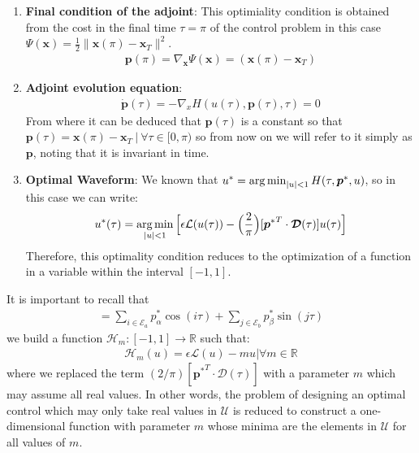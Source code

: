 \begin{enumerate}

    \item \textbf{Final condition of the adjoint}: This optimiality condition is obtained from the cost in the final time $\tau = \pi$ of the control problem in this case $ \Psi (\bm{x}) = \frac {1}{2} \| \bm{x} (\pi) - \bm{x}_T \|^2 $.
    \begin{gather}
        \bm{p}(\pi) = \nabla_{\bm{x}} \Psi(\bm{x}) =  (\bm{x} (\pi) - \bm{x}_T)
    \end{gather}
    \item \textbf{Adjoint evolution equation}: 
    \begin{gather}
        \dot{\bm{p}}(\tau) = -\nabla_x H(u(\tau),\bm{p}(\tau),\tau) = 0
    \end{gather}
    From where it can be deduced that $ \bm {p} (\tau)$ is a constant so that $ \bm {p} (\tau) = \bm {x} (\pi) - \bm { x} _T \ | \ \forall \tau \in [0, \pi) $ so from now on we will refer to it simply as $ \bm {p} $, noting that it is invariant in time.
    \item \textbf{Optimal  Waveform}: We known that $ u^* = \operatorname*{arg\,min}_{|u|<1} H(\tau,\bm{p}^*,u)$, so in this case we can write:
    \begin{gather}
        u^*(\tau) = \operatorname*{arg\,min}_{|u|<1}  \Big[   \epsilon \mathcal{L}(u(\tau)) - \Big(\frac{2}{\pi}\Big)
        [{\bm{p}^*}^T \cdot \bm{\mathcal{D}}(\tau)]
        u(\tau) \Big]
    \end{gather}
    Therefore, this optimality condition reduces to the optimization of a function in a variable within the interval $ [- 1,1] $. 
\end{enumerate}
%
It is important to recall that
\begin{gather}
	[{\bm{p}^*}^T \cdot \bm{\mathcal{D}}(\tau)] = \sum_{i \in \mathcal{E}_a} p^*_\alpha \cos(i\tau) + \sum_{j \in \mathcal{E}_b} p^*_\beta \sin(j\tau) 
\end{gather}
we build a function $\mathcal{H}_m: [-1,1] \rightarrow \mathbb{R}$ such that:
\begin{gather}
    \mathcal{H}_m(u) = \epsilon \mathcal{L}(u) - mu  |  \forall m \in \mathbb{R}
\end{gather}
where we replaced the term $(2/\pi)[{\bm{p}^*}^T \cdot \bm{\mathcal{D}}(\tau)]$ with a parameter $m$ which may assume all real values. In other words, the problem of designing an optimal control which may only take real values in $\mathcal{U}$ is reduced to construct a one-dimensional function with parameter $m$ whose minima are the elements in $\mathcal{U}$ for all values of $m$. 

